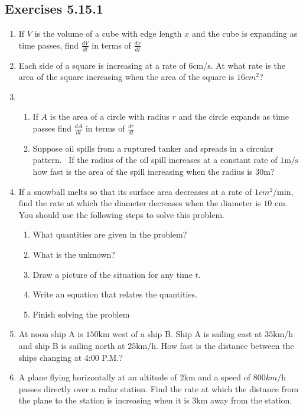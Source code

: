 \subsection{Exercises 5.15.1}
\begin{enumerate}
	\item If $V$ is the volume of a cube with edge length $x$ and the cube is expanding as time passes, find $\frac{d V}{d t}$ in terms of $\frac{d x}{d t}$ 
	
	\item Each side of a square is increasing at a rate of $6 \mbox{cm}$/$\mbox{s}$. At what rate is the area of
	the square increasing when the area of the square is $16 cm^{2}$? 
	
	\item  
	
	
	\begin{enumerate}
		\item If $A$ is the area of a circle with radius $r$ and the circle expands as time passes find $\frac{d A}{d t}$ in terms of $\frac{d r}{d t}$ 
		
		\item Suppose oil spills from a ruptured tanker and spreads in a circular pattern.
		\ If the radius of the oil spill increases at a constant rate of $1 \mathrm{m}/\mbox{s}$ how fast is the area of the spill increasing when the radius is $30 \mbox{m}$? \end{enumerate}
	
	
	\item If
	a snowball melts so that its surface area decreases at a rate of $1 cm^{2}$/$\mbox{min}$, find the rate at which the diameter decreases when the diameter is $10$ $\mbox{cm}$. You should use the following steps to solve this
	problem. 
	
	
	\begin{enumerate}
		\item What quantities are given in the problem? 
		
		\item What is
		the unknown? 
		
		\item Draw a picture of the situation for any time $t$. 
		
		\item Write an equation that relates the quantities. 
		
		\item Finish
		solving the problem \end{enumerate}
	
	
	\item At noon ship A is $150 \mbox{km}$ west of a ship B. Ship A is sailing east at $35 \mbox{km}$/$\mbox{h}$ and ship B is sailing north at $25 \mbox{km}$/$\mbox{h}$. How fast is the distance between
	the ships changing at 4:00 P.M.? 
	
	\item A plane flying horizontally at an altitude of $2 \mbox{km}$ and a speed of $800 km/\mbox{h}$ passes directly over a radar station. Find the rate at which the distance from the plane
	to the station is increasing when it is $3 \mbox{km}$ away from the station. \end{enumerate}



